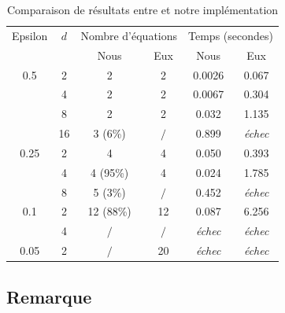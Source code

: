 \documentclass{backend}
\begin{document}
\begin{center}
    \begin{table}[H]
        \centering
        \caption{Comparaison de résultats entre \cite{latAtk} et notre implémentation}
        \label{tab:comparaison_signatures_non_contigu}
        
        \begin{tabular}{|c|c|cc|cc|}
            \toprule
            Epsilon & $d$  & \multicolumn{2}{|c|}{Nombre d'équations} & \multicolumn{2}{|c|}{Temps (secondes)} \\
            \cmidrule{3-6}
            && Nous & Eux & Nous & Eux \\
            \midrule
                0.5 & 2  & 2 & 2 & 0.0026 & 0.067  \\
                    & 4  & 2 & 2 & 0.0067 & 0.304  \\
                    & 8  & 2 & 2 & 0.032 & 1.135 \\
                    & 16 & 3 {\footnotesize (6\%)} & $/$ & 0.899 & \textit{échec} \\
                \hline
                0.25 & 2 & 4 & 4 & 0.050 & 0.393 \\
                     & 4 & 4 {\footnotesize (95\%)} & 4 & 0.024 & 1.785 \\
                     & 8 & 5 {\footnotesize (3\%)} & $/$ & 0.452 & \textit{échec} \\
                \hline
                 0.1 & 2 & 12 {\footnotesize (88\%)} & 12 & 0.087 & 6.256 \\
                     & 4 & $/$ & $/$ & \textit{échec} & \textit{échec} \\
                \hline
                0.05 & 2 & $/$ & 20 & \textit{échec} & \textit{échec} \\
    
            \bottomrule
        \end{tabular}
    \end{table}
\end{center}



\subsection{Remarque}
\end{document}
